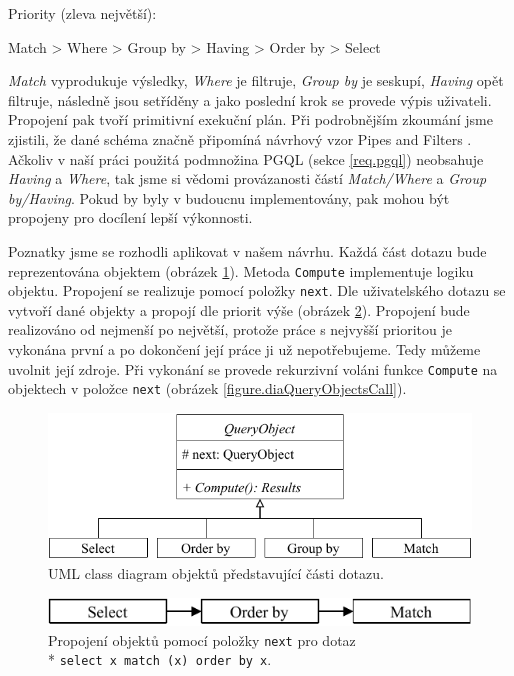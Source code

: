 Priority (zleva největší):
\begin{code}
      Match > Where > Group by > Having > Order by > Select 
\end{code}
\textit{Match} vyprodukuje výsledky, \textit{Where} je filtruje, \textit{Group by} je seskupí, \textit{Having} opět filtruje, následně jsou setříděny a jako poslední krok se provede výpis uživateli.
Propojení pak tvoří primitivní exekuční plán.
Při podrobnějším zkoumání jsme zjistili, že dané schéma značně připomíná návrhový vzor Pipes and Filters \citep[str. 53]{patterns2}.
Ačkoliv v naší práci použitá podmnožina PGQL (sekce \ref{req.pgql}) neobsahuje \textit{Having} a \textit{Where}, tak jsme si vědomi provázanosti částí \textit{Match/Where} a \textit{Group by/Having}.
Pokud by byly v budoucnu implementovány, pak mohou být propojeny pro docílení lepší výkonnosti. 

Poznatky jsme se rozhodli aplikovat v našem návrhu.
Každá část dotazu bude reprezentována objektem (obrázek \ref{figure.diaQueryObjects}).
Metoda \verb+Compute+ implementuje logiku objektu.
Propojení se realizuje pomocí položky \verb+next+.
Dle uživatelského dotazu se vytvoří dané objekty a propojí dle priorit výše (obrázek \ref{figure.diaQueryObjectsCon}).
Propojení bude realizováno od nejmenší po největší, protože práce s nejvyšší prioritou je vykonána první a po dokončení její práce ji už nepotřebujeme.
Tedy můžeme uvolnit její zdroje.
Při vykonání se provede rekurzivní voláni funkce \texttt{Compute} na objektech v položce \verb+next+ (obrázek \ref{figure.diaQueryObjectsCall}). 

\begin{figure}[!htp]
\includegraphics{../img/diaQueryObjects.pdf}\centering
\caption{UML class diagram objektů představující části dotazu.}
\label{figure.diaQueryObjects}
\end{figure}

\begin{figure}[!htp]
\includegraphics{../img/diaQueryObjectsCon.pdf}\centering
\caption{Propojení objektů pomocí položky \texttt{next} pro dotaz\\* \texttt{select x match (x) order by x}.}
\label{figure.diaQueryObjectsCon}
\end{figure}

